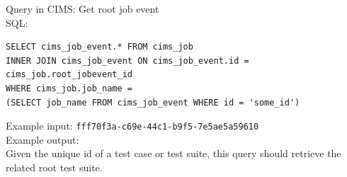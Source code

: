 


\label{q:getrootts}
Query in CIMS: Get root job event \\
SQL:
\begin{verbatim}
SELECT cims_job_event.* FROM cims_job
INNER JOIN cims_job_event ON cims_job_event.id = cims_job.root_jobevent_id
WHERE cims_job.job_name =
(SELECT job_name FROM cims_job_event WHERE id = 'some_id')

\end{verbatim}
Example input: {\tt fff70f3a-c69e-44c1-b9f5-7e5ae5a59610 } \\
Example output: \\
Given the unique id of a test case or test suite, this query should retrieve the related root test suite.

